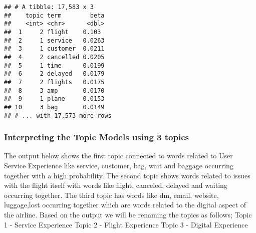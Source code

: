 \documentclass[
]{article}
\newenvironment{Shaded}{\begin{snugshade}}{\end{snugshade}}
\newcommand{\CommentTok}[1]{\textcolor[rgb]{0.56,0.35,0.01}{\textit{#1}}}
\newcommand{\DataTypeTok}[1]{\textcolor[rgb]{0.13,0.29,0.53}{#1}}
\newcommand{\KeywordTok}[1]{\textcolor[rgb]{0.13,0.29,0.53}{\textbf{#1}}}
\newcommand{\NormalTok}[1]{#1}
\newcommand{\OperatorTok}[1]{\textcolor[rgb]{0.81,0.36,0.00}{\textbf{#1}}}
\newcommand{\StringTok}[1]{\textcolor[rgb]{0.31,0.60,0.02}{#1}}
\begin{document}
\begin{Shaded}
\end{Shaded}

\begin{verbatim}
## # A tibble: 17,583 x 3
##    topic term        beta
##    <int> <chr>      <dbl>
##  1     2 flight    0.103 
##  2     1 service   0.0263
##  3     1 customer  0.0211
##  4     2 cancelled 0.0205
##  5     1 time      0.0199
##  6     2 delayed   0.0179
##  7     2 flights   0.0175
##  8     3 amp       0.0170
##  9     1 plane     0.0153
## 10     3 bag       0.0149
## # ... with 17,573 more rows
\end{verbatim}

\hypertarget{interpreting-the-topic-models-using-3-topics}{%
\subsubsection{Interpreting the Topic Models using 3
topics}\label{interpreting-the-topic-models-using-3-topics}}

The output below shows the first topic connected to words related to
User Service Experience like service, customer, bag, wait and baggage
occurring together with a high probability. The second topic shows words
related to issues with the flight itself with words like flight,
canceled, delayed and waiting occurring together. The third topic has
words like dm, email, website, luggage,lost occurring together which are
words related to the digital aspect of the airline. Based on the output
we will be renaming the topics as follows; Topic 1 - Service Experience
Topic 2 - Flight Experience Topic 3 - Digital Experience
\end{document}
